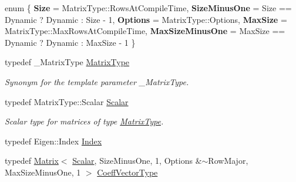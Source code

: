 \begin{DoxyCompactItemize}
\item 
\mbox{\label{class_eigen_1_1_hessenberg_decomposition_abc158afd9265fd46d71e27624149d04e}} 
enum \{ \newline
{\bfseries Size} = Matrix\+Type\+::Rows\+At\+Compile\+Time, 
{\bfseries Size\+Minus\+One} = Size == Dynamic ? Dynamic \+: Size -\/ 1, 
{\bfseries Options} = Matrix\+Type\+::Options, 
{\bfseries Max\+Size} = Matrix\+Type\+::Max\+Rows\+At\+Compile\+Time, 
\newline
{\bfseries Max\+Size\+Minus\+One} = Max\+Size == Dynamic ? Dynamic \+: Max\+Size -\/ 1
 \}
\item 
\mbox{\label{class_eigen_1_1_hessenberg_decomposition_a93a611350a7db9d1da18f2c828ecea9f}} 
typedef \+\_\+\+Matrix\+Type \mbox{\hyperlink{class_eigen_1_1_hessenberg_decomposition_a93a611350a7db9d1da18f2c828ecea9f}{Matrix\+Type}}
\begin{DoxyCompactList}\small\item\em Synonym for the template parameter {\ttfamily \+\_\+\+Matrix\+Type}. \end{DoxyCompactList}\item 
\mbox{\label{class_eigen_1_1_hessenberg_decomposition_a9420c36226cae7d92da8308a3f97ac2f}} 
typedef Matrix\+Type\+::\+Scalar \mbox{\hyperlink{class_eigen_1_1_hessenberg_decomposition_a9420c36226cae7d92da8308a3f97ac2f}{Scalar}}
\begin{DoxyCompactList}\small\item\em Scalar type for matrices of type \mbox{\hyperlink{class_eigen_1_1_hessenberg_decomposition_a93a611350a7db9d1da18f2c828ecea9f}{Matrix\+Type}}. \end{DoxyCompactList}\item 
typedef Eigen\+::\+Index \mbox{\hyperlink{class_eigen_1_1_hessenberg_decomposition_a8e287ac222f53e2c8ce82faa43e95ac6}{Index}}
\item 
typedef \mbox{\hyperlink{class_eigen_1_1_matrix}{Matrix}}$<$ \mbox{\hyperlink{class_eigen_1_1_hessenberg_decomposition_a9420c36226cae7d92da8308a3f97ac2f}{Scalar}}, Size\+Minus\+One, 1, Options \&$\sim$Row\+Major, Max\+Size\+Minus\+One, 1 $>$ \mbox{\hyperlink{class_eigen_1_1_hessenberg_decomposition_a567f99f3770365777b67bf9832b6fac1}{Coeff\+Vector\+Type}}

\end{DoxyCompactItemize}
